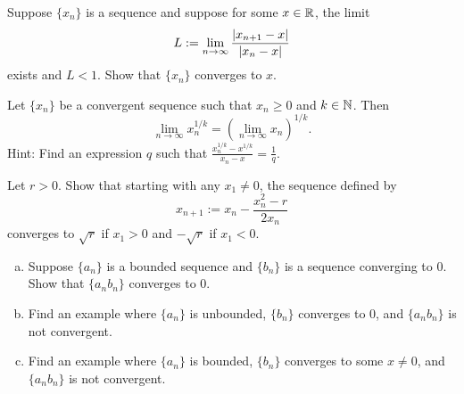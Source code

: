 \begin{exercise}
Suppose $\{ x_n \}$ is a sequence and suppose for
some $x \in {\mathbb{R}}$, the limit
\begin{equation*}
L := \lim_{n \to \infty} \frac{\left\lvert {x_{n+1}-x} \right\rvert}{\left\lvert {x_n-x} \right\rvert}
\end{equation*}
exists and $L < 1$.  Show that $\{ x_n \}$ converges to $x$.
\end{exercise}

\begin{exercise}[Challenging]
Let $\{ x_n \}$ be a convergent sequence such
that $x_n \geq 0$ and $k \in {\mathbb{N}}$.
Then
\begin{equation*}
\lim_{n\to\infty} x_n^{1/k} =
{\left( \lim_{n\to\infty} x_n \right)}^{1/k} .
\end{equation*}
Hint: Find an expression $q$ such that $\frac{x_n^{1/k}-x^{1/k}}{x_n-x} =
\frac{1}{q}$.
\end{exercise}

\begin{exercise}
Let $r > 0$.  Show that starting with any $x_1 \not= 0$, the sequence
defined by
\begin{equation*}
x_{n+1} := x_n - \frac{x_n^2-r}{2x_n}
\end{equation*}
converges to $\sqrt{r}$ if $x_1 > 0$ and $-\sqrt{r}$ if $x_1 < 0$.
\end{exercise}

\begin{samepage}
\begin{exercise}
\leavevmode
\begin{enumerate}[a)]
\item
Suppose $\{ a_n \}$ is a bounded sequence and $\{ b_n \}$ is a sequence
converging to 0. Show that $\{ a_n b_n \}$ converges to 0.
\item
Find an example where $\{ a_n \}$ is unbounded, $\{ b_n \}$ converges to
0, and $\{ a_n b_n \}$ is not convergent.
\item
Find an example where $\{ a_n \}$ is bounded, $\{ b_n \}$ converges to
some $x \not= 0$, and $\{ a_n b_n \}$ is not convergent.
\end{enumerate}
\end{exercise}
\end{samepage}

